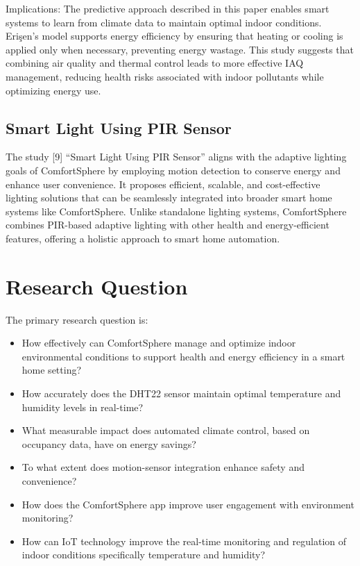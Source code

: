 \documentclass[a4paper]{scrartcl}
\begin{document}
Implications:
The predictive approach described in this paper enables smart systems to learn from climate data to maintain optimal indoor conditions. Erişen’s model supports energy efficiency by ensuring that heating or cooling is applied only when necessary, preventing energy wastage. This study suggests that combining air quality and thermal control leads to more effective IAQ management, reducing health risks associated with indoor pollutants while optimizing energy use.

\subsection{Smart Light Using PIR Sensor}
The study [9] “Smart Light Using PIR Sensor” aligns with the adaptive lighting goals of ComfortSphere by employing motion detection to conserve energy and enhance user convenience. It proposes efficient, scalable, and cost-effective lighting solutions that can be seamlessly integrated into broader smart home systems like ComfortSphere. Unlike standalone lighting systems, ComfortSphere combines PIR-based adaptive lighting with other health and energy-efficient features, offering a holistic approach to smart home automation.\\




\section{Research Question}
The primary research question is:

\begin{itemize}
    \item How effectively can ComfortSphere manage and optimize indoor environmental conditions to support health and energy efficiency in a smart home setting?
    \item How accurately does the DHT22 sensor maintain optimal temperature and humidity levels in real-time?
    \item What measurable impact does automated climate control, based on occupancy data, have on energy savings?
    \item To what extent does motion-sensor integration enhance safety and convenience?
    \item How does the ComfortSphere app improve user engagement with environment monitoring?
    \item How can IoT technology improve the real-time monitoring and regulation of indoor conditions specifically temperature and humidity?
\end{itemize}
\end{document}
